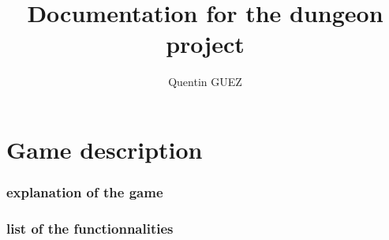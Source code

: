 \documentclass[17pt]{extarticle}
\title{\Huge{Documentation for the dungeon project}}
\author{Quentin GUEZ}
\date{}
\begin{document}
\maketitle

\clearpage

\part{Game description}

\section{explanation of the game}



\section{list of the functionnalities}
\end{document}
